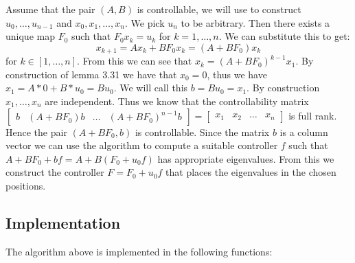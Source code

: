 
Assume that the pair $(A,B)$ is controllable, we will use \cite[Lemma 3.31]{bookTrentelman} to construct $u_0, \dots , u_{n-1}$ and $x_0,x_1, \dots ,x_n$. We pick $u_n$ to be arbitrary. Then there exists a unique map $F_0$ such that $F_0 x_k = u_k$ for $k = 1,\dots,n$. We can substitute this to get:
\[ x_{k+1} = Ax_k + BF_0 x_k = (A + BF_0 ) x_k \]
for $k \in [1, \dots, n]$. From this we can see that $x_k = (A+BF_0)^{k-1} x_1$. By construction of lemma 3.31 we have that $x_0 = 0$, thus we have $x_1 = A * 0 + B * u_0 = Bu_0$. We will call this $b = Bu_0 = x_1$. By construction $x_1,\dots,x_n$ are independent. Thus we know that the controllability matrix $\begin{bmatrix}b&(A+BF_0)b&\dots&(A+BF_0)^{n-1}b\end{bmatrix} = \begin{bmatrix}x_1&x_2&\dots&x_n\end{bmatrix}$ is full rank. Hence the pair $(A+BF_0,b)$ is controllable. Since the matrix $b$ is a column vector we can use the  algorithm to compute a suitable controller $f$ such that $A+BF_0 + bf = A + B(F_0 + u_0 f)$ has appropriate eigenvalues. From this we construct the controller $F = F_0 + u_0 f$ that places the eigenvalues in the chosen positions.


\subsection{Implementation}
The algorithm above is implemented in the following functions:
